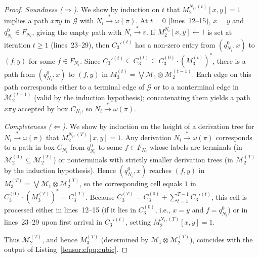 \begin{proof}
\emph{Soundness ($\Rightarrow$).}
We show by induction on $t$ that $M_2^{N_i,(t)}[x, y] = 1$ implies a path $x\pi y$ in $\mathcal{G}$ with $N_i \xrightarrow{*} \omega(\pi)$.
At $t = 0$ (lines~12--15), $x = y$ and $q_{N_i}^0 \in F_{N_i}$, giving the empty path with $N_i \xrightarrow{*} \varepsilon$.
If $M_2^{N_i}[x, y] \gets 1$ is set at iteration $t \ge 1$ (lines~23--29), then $C_3'^{(t)}$ has a non-zero entry from $(q_{N_i}^0, x)$ to $(f, y)$ for some $f \in F_{N_i}$.
Since $C_3'^{(t)} \subseteq C_3^{(t)} \subseteq C_3^{(0)} \cdot (M_3^{(t)})^*$, there is a path from $(q_{N_i}^0, x)$ to $(f, y)$ in $M_3^{(t)} = \bigvee \mathcal{M}_1 \otimes \mathcal{M}_2^{(t-1)}$.
Each edge on this path corresponds either to a terminal edge of $\mathcal{G}$ or to a nonterminal edge in $\mathcal{M}_2^{(t-1)}$ (valid by the induction hypothesis); concatenating them yields a path $x\pi y$ accepted by box $C_{N_i}$, so $N_i \xrightarrow{*} \omega(\pi)$.

\emph{Completeness ($\Leftarrow$).}
We show by induction on the height of a derivation tree for $N_i \xrightarrow{*} \omega(\pi)$ that $M_2^{N_i,(T)}[x, y] = 1$.
Any derivation $N_i \xrightarrow{*} \omega(\pi)$ corresponds to a path in box $C_{N_i}$ from $q_{N_i}^0$ to some $f \in F_{N_i}$ whose labels are terminals (in $\mathcal{M}_2^{(0)} \subseteq \mathcal{M}_2^{(T)}$) or nonterminals with strictly smaller derivation trees (in $\mathcal{M}_2^{(T)}$ by the induction hypothesis).
Hence $(q_{N_i}^0, x)$ reaches $(f, y)$ in $M_3^{(T)} = \bigvee \mathcal{M}_1 \otimes \mathcal{M}_2^{(T)}$, so the corresponding cell equals $1$ in $C_3^{(0)} \cdot (M_3^{(T)})^* = C_3^{(T)}$.
Because $C_3^{(T)} = C_3^{(0)} + \sum_{t=1}^{T-1} C_3'^{(t)}$, this cell is processed either in lines~12--15 (if it lies in $C_3^{(0)}$, i.e., $x = y$ and $f = q_{N_i}^0$) or in lines~23--29 upon first arrival in $C_3'^{(t)}$, setting $M_2^{N_i,(T)}[x, y] = 1$.

Thus $\mathcal{M}_2^{(T)}$, and hence $M_3^{(T)}$ (determined by $\mathcal{M}_1 \otimes \mathcal{M}_2^{(T)}$), coincides with the output of Listing~\ref{tensor:cfpq:cubic}.
\end{proof}
